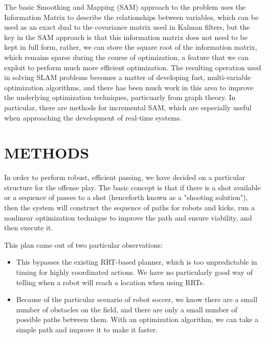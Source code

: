 \documentclass[a4paper, 10pt, conference]{ieeeconf}      %
\begin{document}
The basic Smoothing and Mapping (SAM) approach\cite{Dellaert05tr} to the problem uses the Information Matrix to describe the relationships between variables, which can be used as an exact dual to the covariance matrix used in Kalman filters, but the key in the SAM approach is that this information matrix does not need to be kept in full form, rather, we can store the square root of the information matrix, which remains sparse during the course of optimization, a feature that we can exploit to perform much more efficient optimization.  The resulting operation used in solving SLAM problems becomes a matter of developing fast, multi-variable optimization algorithms, and there has been much work in this area to improve the underlying optimization techniques, particuarly from graph theory\cite{Triggs99, Bertele72jmaa, Bertele72book}.  In particular, there are methods for incremental SAM\cite{Dellaert06ijrr}, which are especially useful when approaching the development of real-time systems.

\section{METHODS}
In order to perform robust, efficient passing, we have decided on a particular structure for the offense play. The basic concept is that if there is a shot available or a sequence of passes to a shot (henceforth known as a "shooting solution"), then the system will construct the sequence of paths for robots and kicks, run a nonlinear optimization technique to improve the path and ensure viability, and then execute it.

This plan came out of two particular observations:

\begin{itemize}
 \item This bypasses the existing RRT-based planner, which is too unpredictable in timing for highly coordinated actions. We have no particularly good way of telling when a robot will reach a location when using RRTs.
 \item Because of the particular scenario of robot soccer, we know there are a small number of obstacles on the field, and there are only a small number of possible paths between them. With an optimization algorithm, we can take a simple path and improve it to make it faster.
\end{itemize}
\end{document}
